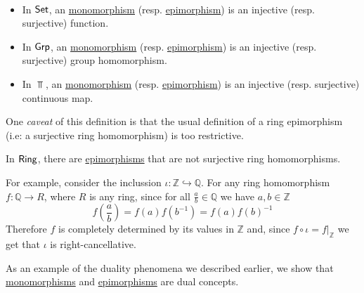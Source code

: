 \documentclass[../../main]{subfiles}
\begin{document}
\begin{example}~
  \begin{itemize}
    \item In \(\mathsf{Set}\), an \hyperref[def:mono-epi-morphism]{monomorphism} (resp. \hyperref[def:mono-epi-morphism]{epimorphism}) is an injective (resp. surjective) function.
    \item In \(\mathsf{Grp}\), an \hyperref[def:mono-epi-morphism]{monomorphism} (resp. \hyperref[def:mono-epi-morphism]{epimorphism}) is an injective (resp. surjective) group homomorphism.
    \item In \(\Top\), an \hyperref[def:mono-epi-morphism]{monomorphism} (resp. \hyperref[def:mono-epi-morphism]{epimorphism}) is an injective (resp. surjective) continuous map.
  \end{itemize}
\end{example}

One \textit{caveat} of this definition is that the usual definition of a ring epimorphism (i.e: a surjective ring homomorphism) is too restrictive.

\begin{example}
  In \(\mathsf{Ring}\), there are \hyperref[def:mono-epi-morphism]{epimorphisms} that are not surjective ring homomorphisms.

  For example, consider the inclussion \(\iota\colon \mathbb{Z} \hookrightarrow \mathbb{Q}\).
  For any ring homomorphism \(f\colon \mathbb{Q} \to R\), where \(R\) is any ring, since for all \(\frac{a}{b} \in \mathbb{Q}\) we have \(a, b \in \mathbb{Z}\)
  \begin{equation*}
    f \left( \frac{a}{b} \right) = f(a) f(b^{-1}) = f(a) f(b)^{-1}
  \end{equation*}
  Therefore \(f\) is completely determined by its values in \(\mathbb{Z}\) and, since \(f \circ \iota = f|_{\mathbb{Z}}\) we get that \(\iota\) is right-cancellative.
\end{example}

As an example of the duality phenomena we described earlier, we show that \hyperref[def:mono-epi-morphism]{monomorphisms} and \hyperref[def:mono-epi-morphism]{epimorphisms} are dual concepts.
\end{document}
